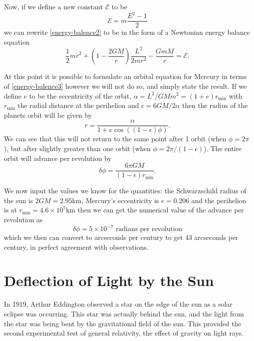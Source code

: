 Now, if we define a new constant \(\mathcal{E}\) to be
\begin{equation} \label{weird-E}
	\mathcal{E} = m \frac{E^2 - 1}{2}
\end{equation}
we can rewrite \eqref{energy-balence2} to be in the form of a Newtonian energy balance equation \cite{cheng}
\begin{equation} \label{energy-balence3}
	\frac{1}{2} m \dot{r}^2 + \left( 1 - \frac{2 G M}{r}\right) \frac{L^2}{2mr^2} - \frac{G m M}{r} = \mathcal{E} .
\end{equation}

At this point it is possible to formulate an orbital equation for Mercury in terms of \eqref{energy-balence3} however we will not do so, and simply state the result. If we define \(e\) to be the eccentricity of the orbit, \(\alpha = L^2 / GMm^2 = (1+e)r_{\text{min}}\) with \(r_{\text{min}}\) the radial distance at the perihelion and \(\epsilon = 6GM/2\alpha\) then the radius of the planets orbit will be given by
\begin{equation} \label{perihelion}
	r = \frac{\alpha}{1 + e \cos ((1 - \epsilon) \phi)} .
\end{equation}
We can see that this will not return to the same point after 1 orbit (when \( \phi = 2 \pi\)), but after slightly greater than one orbit (when \(\phi = 2 \pi / (1 - \epsilon)\)). The entire orbit will advance per revolution by
\begin{equation} \label{perihelion-advance}
	\delta \phi = \frac{6 \pi G M}{(1 - \epsilon) r_{\text{min}}} .
\end{equation}

We now input the values we know for the quantities: the Schwarzschild radius of the sun is \(2GM = 2.95\)km, Mercury's eccentricity is \(e = 0.206\) and the perihelion is at \(r_{\text{min}} = 4.6 \times 10^{7}\)km \cite{cheng} then we can get the numerical value of the advance per revolution as
\begin{equation} \label{perihelion-solved}
	\delta \phi = 5 \times 10^{-7} \, \, \text{radians per revolution}
\end{equation}
which we then can convert to arcseconds per century to get 43 arcseconds per century, in perfect agreement with observations. 
\section{Deflection of Light by the Sun}

In 1919, Arthur Eddington observed a star on the edge of the sun as a solar eclipse was occurring. This star was actually behind the sun, and the light from the star was being bent by the gravitational field of the sun. This provided the second experimental test of general relativity, the effect of gravity on light rays.

